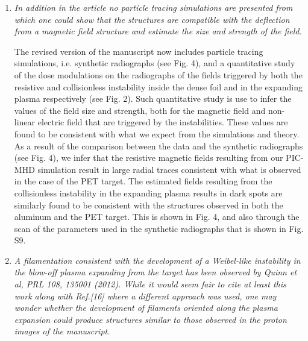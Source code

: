 \documentclass[aps,showpacs,superscriptaddress]{revtex4}%
\begin{document}
\begin{enumerate}
\item \textit{In addition in the article no particle tracing simulations are presented from which one could show that the structures are compatible with the deflection from a magnetic field structure and estimate the size and strength of the field. }

The revised version of the manuscript now includes particle tracing simulations, i.e. synthetic radiographs (see Fig. 4), and a quantitative study of the dose modulations on the radiographs of the  fields triggered by both  the resistive and collisionless instability inside the dense foil and in the expanding plasma respectively (see Fig. 2). Such quantitative study is use to infer the values of the field size and strength, both for the magnetic field and non-linear electric field  that are triggered by the instabilities.  These values are found to be consistent with what we expect from the simulations and theory.
As a result of the comparison between the data and the synthetic radiographs (see Fig. 4), we infer that the resistive magnetic fields resulting from our PIC-MHD simulation result in large radial traces consistent with what is observed in the case of the PET target. The estimated fields resulting from the collisionless instability in the expanding plasma results in dark spots are similarly found to be consistent with the structures observed in both the aluminum and the PET target. This is shown in Fig. 4, and also through the scan of the parameters used in the synthetic radiographs that is shown in Fig. S9.

\item \textit{A filamentation consistent with the development of a Weibel-like instability in the blow-off plasma expanding from the target has been observed by Quinn et al, PRL 108, 135001 (2012). While it would seem fair to cite at least this work along with Ref.[16] where a different approach was used, one may wonder whether the development of filaments oriented along the plasma expansion could produce structures similar to those observed in the proton images of the manuscript. }


\end{enumerate}
\end{document}
